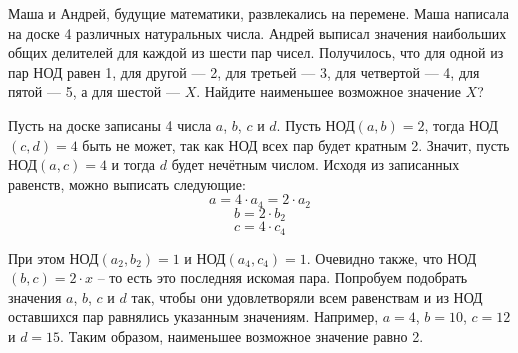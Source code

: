 
Маша и Андрей, будущие математики, развлекались на перемене. 
Маша написала на доске 4  различных натуральных числа. 
Андрей выписал значения наибольших общих делителей для каждой из шести пар чисел. 
Получилось, что для одной из пар НОД  равен 1, для другой — 2, для третьей — 3, для четвертой — 4, 
для пятой — 5, а для шестой — $X$. Найдите наименьшее возможное значение $X$?

\soultionSection

Пусть на доске записаны 4 числа $a$, $b$, $c$ и $d$. Пусть НОД$(a, b) = 2$, тогда НОД$(c, d) = 4$ быть не 
может, так как НОД всех пар будет кратным 2. Значит, пусть НОД$(a, c) = 4$ и тогда $d$ будет нечётным числом.
Исходя из записанных равенств, можно выписать следующие:
$$a = 4\cdot a_4 = 2 \cdot a_2$$
$$b = 2\cdot b_2$$
$$c = 4\cdot c_4$$

При этом НОД$(a_2, b_2) = 1$ и НОД$(a_4, c_4) = 1$. 
Очевидно также, что \linebreak НОД$(b, c) = 2 \cdot x$ -- то есть это последняя искомая пара. Попробуем подобрать значения $a$, $b$, $c$ и $d$ так, чтобы они удовлетворяли всем равенствам и из НОД оставшихся пар равнялись указанным значениям. Например, $a = 4$, $b = 10$, $c = 12$ и $d = 15$. Таким образом, наименьшее возможное значение равно 2.

